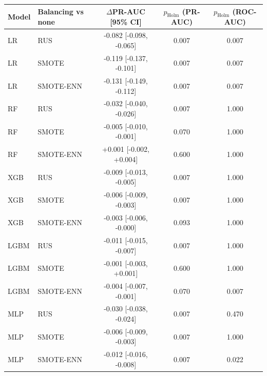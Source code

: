 \begin{tabular}{llccc}
\hline
Model & Balancing vs none & $\Delta$PR-AUC [95\% CI] & $p_{\mathrm{Holm}}$ (PR-AUC) & $p_{\mathrm{Holm}}$ (ROC-AUC) \\
\hline
LR & RUS & -0.082 [-0.098, -0.065] & 0.007 & 0.007 \\
LR & SMOTE & -0.119 [-0.137, -0.101] & 0.007 & 0.007 \\
LR & SMOTE-ENN & -0.131 [-0.149, -0.112] & 0.007 & 0.007 \\
RF & RUS & -0.032 [-0.040, -0.026] & 0.007 & 1.000 \\
RF & SMOTE & -0.005 [-0.010, -0.001] & 0.070 & 1.000 \\
RF & SMOTE-ENN & +0.001 [-0.002, +0.004] & 0.600 & 1.000 \\
XGB & RUS & -0.009 [-0.013, -0.005] & 0.007 & 1.000 \\
XGB & SMOTE & -0.006 [-0.009, -0.003] & 0.007 & 1.000 \\
XGB & SMOTE-ENN & -0.003 [-0.006, -0.000] & 0.093 & 1.000 \\
LGBM & RUS & -0.011 [-0.015, -0.007] & 0.007 & 1.000 \\
LGBM & SMOTE & -0.001 [-0.003, +0.001] & 0.600 & 1.000 \\
LGBM & SMOTE-ENN & -0.004 [-0.007, -0.001] & 0.070 & 0.007 \\
MLP & RUS & -0.030 [-0.038, -0.024] & 0.007 & 0.470 \\
MLP & SMOTE & -0.006 [-0.009, -0.003] & 0.007 & 1.000 \\
MLP & SMOTE-ENN & -0.012 [-0.016, -0.008] & 0.007 & 0.022 \\
\hline
\end{tabular}
